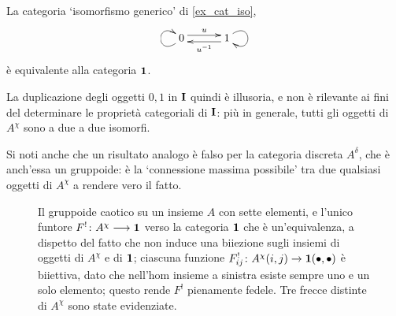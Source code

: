 \begin{remark}
 La categoria `isomorfismo generico' di \ref{ex_cat_iso},
 \[\xymatrix@C=7ex{0 \ar@<.7ex>[r]^u \ar@(dl,ul)[] & 1 \ar@<.7ex>[l]^{u^{-1}} \ar@(ur,dr)[]}\]
 è equivalente alla categoria \(\mathbf{1}\).
\end{remark}
La duplicazione degli oggetti \(0,1\)	in \(\mathbf{I}\) quindi è illusoria, e non è rilevante ai fini del determinare le proprietà categoriali di \(\mathbf{I}\): più in generale, tutti gli oggetti di \(A^\chi\) sono a due a due isomorfi.

Si noti anche che un risultato analogo è falso per la categoria discreta \(A^\delta\), che è anch'essa un gruppoide: è la `connessione massima possibile' tra due qualsiasi oggetti di \(A^\chi\) a rendere vero il fatto.
\begin{figure}
 \begin{center}
 \end{center}
 \caption{Il gruppoide caotico su un insieme \(A\) con sette elementi, e l'unico funtore \(F^! \colon A^\chi \longrightarrow\mathbf{1}\) verso la categoria \(\mathbf{1}\) che è un'equivalenza, a dispetto del fatto che non induce una biiezione sugli insiemi di oggetti di \(A^\chi\) e di \(\mathbf{1}\); ciascuna funzione \(F_{ij}^! \colon A^\chi(i,j) \to \mathbf{1}(\bullet,\bullet)\) è biiettiva, dato che nell'hom insieme a sinistra esiste sempre uno e un solo elemento; questo rende \(F^!\) pienamente fedele. Tre frecce distinte di \(A^\chi\) sono state evidenziate.}
\end{figure}
